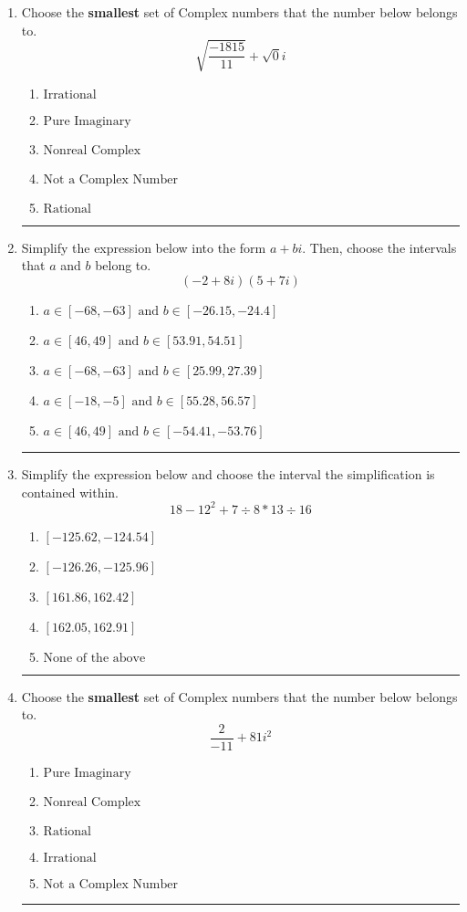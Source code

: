 \documentclass[14pt]{extbook}
\newcommand{\litem}[1]{\item#1\hspace*{-1cm}\rule{\textwidth}{0.4pt}}
\begin{document}
\begin{enumerate}
{\begin{enumerate}[label=\Alph*.]
\end{enumerate} }
\litem{
Choose the \textbf{smallest} set of Complex numbers that the number below belongs to.\[ \sqrt{\frac{-1815}{11}}+\sqrt{0}i \]\begin{enumerate}[label=\Alph*.]
\item \( \text{Irrational} \)
\item \( \text{Pure Imaginary} \)
\item \( \text{Nonreal Complex} \)
\item \( \text{Not a Complex Number} \)
\item \( \text{Rational} \)

\end{enumerate} }
\litem{
Simplify the expression below into the form $a+bi$. Then, choose the intervals that $a$ and $b$ belong to.\[ (-2 + 8 i)(5 + 7 i) \]\begin{enumerate}[label=\Alph*.]
\item \( a \in [-68, -63] \text{ and } b \in [-26.15, -24.4] \)
\item \( a \in [46, 49] \text{ and } b \in [53.91, 54.51] \)
\item \( a \in [-68, -63] \text{ and } b \in [25.99, 27.39] \)
\item \( a \in [-18, -5] \text{ and } b \in [55.28, 56.57] \)
\item \( a \in [46, 49] \text{ and } b \in [-54.41, -53.76] \)

\end{enumerate} }
\litem{
Simplify the expression below and choose the interval the simplification is contained within.\[ 18 - 12^2 + 7 \div 8 * 13 \div 16 \]\begin{enumerate}[label=\Alph*.]
\item \( [-125.62, -124.54] \)
\item \( [-126.26, -125.96] \)
\item \( [161.86, 162.42] \)
\item \( [162.05, 162.91] \)
\item \( \text{None of the above} \)

\end{enumerate} }
\litem{
Choose the \textbf{smallest} set of Complex numbers that the number below belongs to.\[ \frac{2}{-11}+81i^2 \]\begin{enumerate}[label=\Alph*.]
\item \( \text{Pure Imaginary} \)
\item \( \text{Nonreal Complex} \)
\item \( \text{Rational} \)
\item \( \text{Irrational} \)
\item \( \text{Not a Complex Number} \)


\end{enumerate}}
\end{enumerate}
\end{document}
